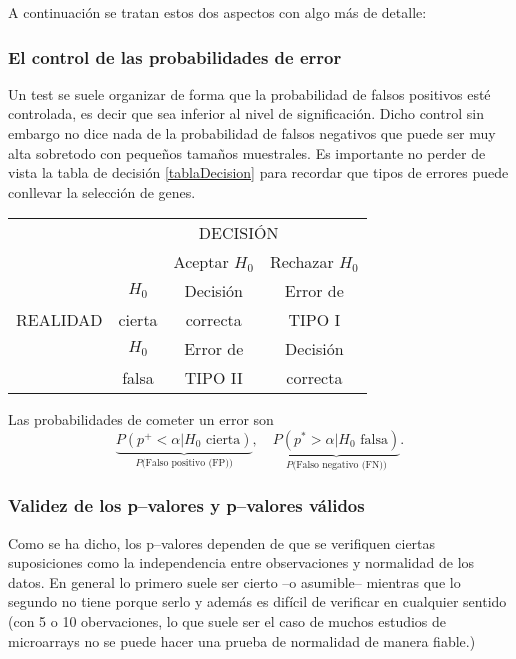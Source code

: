 A continuaci\'on se tratan estos dos aspectos con algo m\'as de detalle:

\subsubsection{El control de las probabilidades de error}

Un test se suele organizar de forma que la probabilidad de falsos positivos est\'e controlada, es decir que sea inferior al nivel
de significaci\'on. Dicho control sin embargo no dice nada de la probabilidad de falsos negativos que puede ser muy alta
sobretodo con peque\~nos tama\~nos muestrales. Es importante no perder de vista la tabla de decisi\'on \ref{tablaDecision} para
recordar que tipos de errores puede conllevar la selecci\'on de genes.

 \begin{center}
\begin{tabular}{l c|c|c|}\label{tablaDecision}
&\multicolumn{3}{c}{\hspace*{3em}DECISI\'ON} \\
&& Aceptar $H_0$ & Rechazar $H_0$ \\ \cline{2-4}
&$H_0$   & Decisi\'on & Error de \\
REALIDAD &cierta  & correcta & TIPO I   \\ \cline{2-4}
&$H_0$   & Error de & Decisi\'on \\
&falsa   & TIPO II  & correcta \\ \cline{2-4}
\end{tabular}
\end{center}
Las probabilidades de cometer un error son
$$
 \underbrace{P(p^+< \alpha |H_0\mbox{ cierta})}_{P(\mbox{Falso positivo (FP))}},\quad
 \underbrace{P(p^*> \alpha|H_0\mbox{ falsa})}_{P(\mbox{Falso negativo (FN))}}.
$$

\subsubsection{Validez de los p--valores y p--valores v\'alidos}
Como se ha dicho, los p--valores dependen de que se verifiquen ciertas suposiciones como la independencia entre observaciones y
normalidad de los datos. En general lo primero suele ser cierto --o asumible-- mientras que lo segundo no tiene porque serlo y
adem\'as es dif\'icil de verificar en cualquier sentido (con 5 o 10 obervaciones, lo que suele ser el caso de muchos estudios de
microarrays no se puede hacer una prueba de normalidad de manera fiable.)


